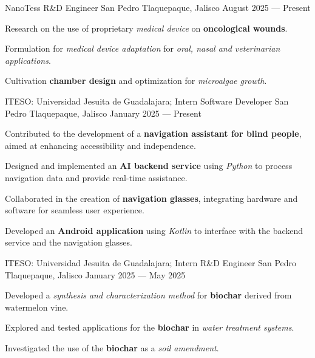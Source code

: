 \begin{cventries}

  \cventry
  {NanoTess}
  {R\&D Engineer}
  {San Pedro Tlaquepaque, Jalisco}
  {August 2025 --- Present}
  {
    \begin{cvitems}
      \item {Research on the use of proprietary \textit{medical device} on \textbf{oncological wounds}.}
      \item {Formulation for \textit{medical device adaptation} for \textit{oral, nasal and veterinarian applications}.}
      \item {Cultivation \textbf{chamber design} and optimization for \textit{microalgae growth}.}
    \end{cvitems}
  }

  \cventry
  {ITESO\@: Universidad Jesuita de Guadalajara; Intern}
  {Software Developer}
  {San Pedro Tlaquepaque, Jalisco}
  {January 2025 --- Present}
  {
    \begin{cvitems}
      \item {Contributed to the development of a \textbf{navigation assistant for blind people}, aimed at enhancing accessibility and independence.}
      \item {Designed and implemented an \textbf{AI backend service} using \textit{Python} to process navigation data and provide real-time assistance.}
      \item {Collaborated in the creation of \textbf{navigation glasses}, integrating hardware and software for seamless user experience.}
      \item {Developed an \textbf{Android application} using \textit{Kotlin} to interface with the backend service and the navigation glasses.}
    \end{cvitems}
  }

  \cventry
  {ITESO\@: Universidad Jesuita de Guadalajara; Intern}
  {R\&D Engineer}
  {San Pedro Tlaquepaque, Jalisco}
  {January 2025 --- May 2025}
  {
    \begin{cvitems}
      \item {Developed a \textit{synthesis and characterization method} for \textbf{biochar} derived from watermelon vine.}
      \item {Explored and tested applications for the \textbf{biochar} in \textit{water treatment systems}.}
      \item {Investigated the use of the \textbf{biochar} as a \textit{soil amendment}.}
    \end{cvitems}
  }


\end{cventries}
